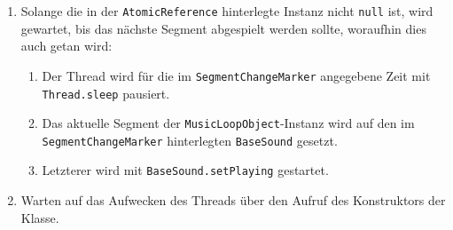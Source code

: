 \begin{sloppypar}
\begin{enumerate}
	\item Solange die in der \texttt{AtomicReference} hinterlegte
	      Instanz nicht \texttt{null} ist, wird gewartet, bis das
	      nächste Segment abgespielt werden sollte, woraufhin dies
	      auch getan wird:
	      \begin{enumerate}
	      	\item Der Thread wird für die im \texttt{SegmentChangeMarker}
	      	      angegebene Zeit mit \texttt{Thread.sleep} pausiert.
	      	\item Das aktuelle Segment der \texttt{MusicLoopObject}-Instanz
	      	      wird auf den im \texttt{SegmentChangeMarker} hinterlegten
	      	      \texttt{BaseSound} gesetzt.
	      	\item Letzterer wird mit \texttt{BaseSound.setPlaying} gestartet.
	      \end{enumerate}
	\item Warten auf das Aufwecken des Threads über den Aufruf
	      des Konstruktors der Klasse.
\end{enumerate}

\end{sloppypar}